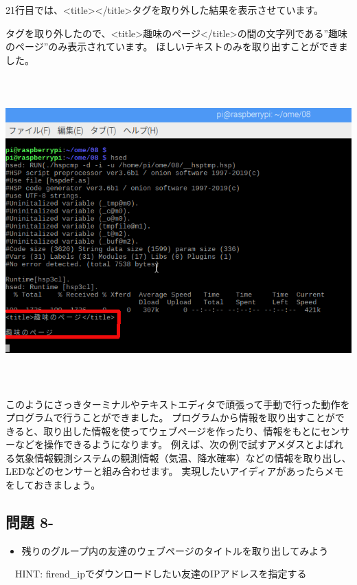 \documentclass[a4paper,12pt,dvipdfmx]{jarticle}
\newcounter{Question}
\renewcommand\theQuestion{\textbf{問題 8-\arabic{Question}}}
\begin{document}
\bigskip

21行目では、{\textless}title{\textgreater}{\textless}/title{\textgreater}タグを取り外した結果を表示させています。

タグを取り外したので、{\textless}title{\textgreater}趣味のページ{\textless}/title{\textgreater}の間の文字列である”趣味のページ”のみ表示されています。
ほしいテキストのみを取り出すことができました。



\begin{center}
\includegraphics[width=15.411cm,height=11.841cm]{textbook-img015.png}

\end{center}

\bigskip


\bigskip


\bigskip

このようにさっきターミナルやテキストエディタで頑張って手動で行った動作をプログラムで行うことができました。
プログラムから情報を取り出すことができると、取り出した情報を使ってウェブページを作ったり、情報をもとにセンサーなどを操作できるようになります。
例えば、次の例で試すアメダスとよばれる気象情報観測システムの観測情報（気温、降水確率）などの情報を取り出し、LEDなどのセンサーと組み合わせます。
実現したいアイディアがあったらメモをしておきましょう。

\clearpage\subsection*{\theQuestion}
\begin{itemize}
\item
残りのグループ内の友達のウェブページのタイトルを取り出してみよう
\end{itemize}
\ \ HINT:
firend\_ipでダウンロードしたい友達のIPアドレスを指定する
\end{document}
